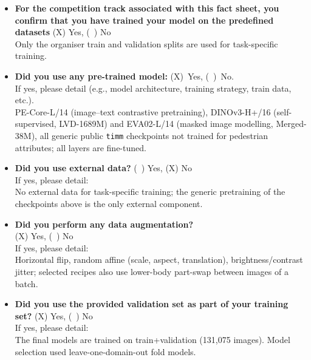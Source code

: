 \documentclass[a4paper, 10pt, conference]{ieeeconf}
\begin{document}
%
%
\begin{itemize}
\item \textbf{For the competition track associated with this fact sheet, you confirm that you have trained your model on the predefined datasets} (X) Yes, (~) No\\
Only the organiser train and validation splits are used for task-specific training.

\item \textbf{Did you use any pre-trained model:} (X)~Yes, (~)~No.\\ If yes, please detail (e.g., model architecture, training strategy, train data, etc.).\\
PE-Core-L/14 (image--text contrastive pretraining), DINOv3-H+/16 (self-supervised, LVD-1689M) and EVA02-L/14 (masked image modelling, Merged-38M), all generic public \texttt{timm} checkpoints not trained for pedestrian attributes; all layers are fine-tuned.
%
%

\item \textbf{Did you use external data?} (~) Yes, (X) No\\
If yes, please detail:\\
No external data for task-specific training; the generic pretraining of the checkpoints above is the only external component.
%
%

\item \textbf{Did you perform any data augmentation?} \\(X) Yes, (~) No\\
If yes, please detail:\\
Horizontal flip, random affine (scale, aspect, translation), brightness/contrast jitter; selected recipes also use lower-body part-swap between images of a batch.
%
%

\item \textbf{Did you use the provided validation set as part of your training set?} (X) Yes, (~) No\\
If yes, please detail:\\
The final models are trained on train+validation (131{,}075 images). Model selection used leave-one-domain-out fold models.
%
%



\end{itemize}
\end{document}

